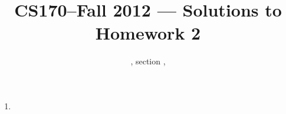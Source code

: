 \documentclass[11pt]{article}
\title{CS170--Fall 2012 --- Solutions to Homework 2}
\author{\Name, section \Sec, \texttt{\Login}}
\begin{document}
\maketitle

\begin{enumerate}
\item 
\end{enumerate}
\end{document}
